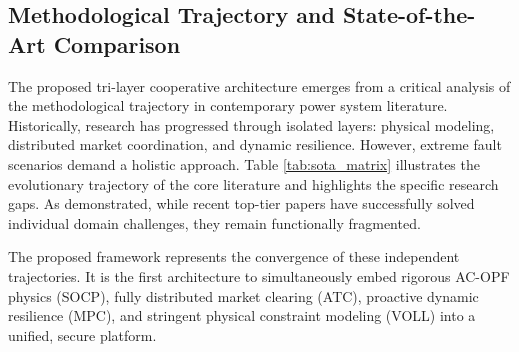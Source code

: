 \subsection{Methodological Trajectory and State-of-the-Art Comparison}

The proposed tri-layer cooperative architecture emerges from a critical analysis of the methodological trajectory in contemporary power system literature. Historically, research has progressed through isolated layers: physical modeling, distributed market coordination, and dynamic resilience. However, extreme fault scenarios demand a holistic approach. Table \ref{tab:sota_matrix} illustrates the evolutionary trajectory of the core literature and highlights the specific research gaps. As demonstrated, while recent top-tier papers have successfully solved individual domain challenges, they remain functionally fragmented. 

The proposed framework represents the convergence of these independent trajectories. It is the first architecture to simultaneously embed rigorous AC-OPF physics (SOCP), fully distributed market clearing (ATC), proactive dynamic resilience (MPC), and stringent physical constraint modeling (VOLL) into a unified, secure platform.

